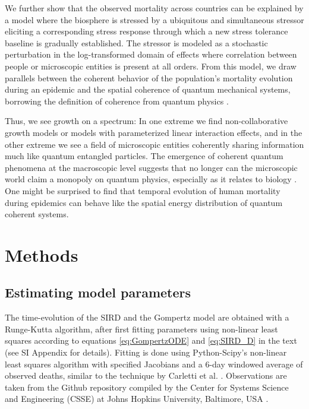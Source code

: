 \documentclass{article}
\begin{document}
We further show that the observed mortality across countries can be explained by a model where the biosphere is stressed by a ubiquitous and simultaneous stressor eliciting a corresponding stress response through which a new stress tolerance baseline is gradually established. The stressor is modeled as a stochastic perturbation in the log-transformed domain of effects where correlation between people or microscopic entities is present at all orders. From this model, we draw parallels between the coherent behavior of the population's mortality evolution during an epidemic and the spatial coherence of quantum mechanical systems, borrowing the definition of coherence from quantum physics \cite{molski2003coherent}.

Thus, we see growth on a spectrum: In one extreme we find non-collaborative growth models or models with parameterized linear interaction effects, and in the other extreme we see a field of microscopic entities coherently sharing information much like quantum entangled particles. The emergence of coherent quantum phenomena at the macroscopic level suggests that no longer can the microscopic world claim a monopoly on quantum physics, especially as it relates to biology \cite{lambert2013quantum}. One might be surprised to find that temporal evolution of human mortality during epidemics can behave like the spatial energy distribution of quantum coherent systems.

\section*{Methods}

\subsection*{Estimating model parameters}
The time-evolution of the SIRD and the Gompertz model are obtained with a Runge-Kutta algorithm, after first fitting parameters using non-linear least squares according to equations \ref{eq:GompertzODE} and \ref{eq:SIRD_D} in the text (see SI Appendix for details). 
Fitting is done using Python-Scipy's non-linear least squares algorithm with specified Jacobians and a 6-day windowed average of observed deaths, similar to the technique by Carletti et al. \cite{carletti2020covid}. 
Observations are taken from the Github repository compiled by the Center for Systems Science and Engineering (CSSE) at Johns Hopkins University, Baltimore, USA \cite{dong2020interactive}. 
\end{document}
